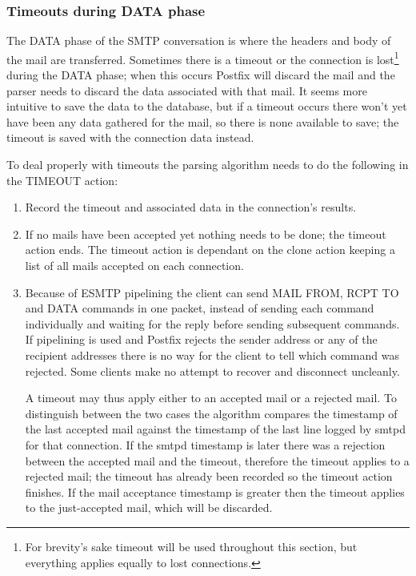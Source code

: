 \documentclass[a4paper,12pt,draft]{article}
\begin{document}
\subsubsection{Timeouts during DATA phase}

\label{timeouts-during-data-phase}

The DATA phase of the SMTP conversation is where the headers and body of the
mail are transferred.  Sometimes there is a timeout or the connection is
lost\footnote{For brevity's sake timeout will be used throughout this
section, but everything applies equally to lost connections.} during the
DATA phase; when this occurs Postfix will discard the mail and the parser
needs to discard the data associated with that mail.  It seems more
intuitive to save the data to the database, but if a timeout occurs there
won't yet have been any data gathered for the mail, so there is none
available to save; the timeout is saved with the connection data instead.

To deal properly with timeouts the parsing algorithm needs to do the
following in the TIMEOUT action:

\begin{enumerate}

    \item Record the timeout and associated data in the connection's
        results.

    \item If no mails have been accepted yet nothing needs to be done; the
        timeout action ends.  The timeout action is dependant on the clone
        action keeping a list of all mails accepted on each connection.

    \item Because of ESMTP pipelining the client can send MAIL FROM, RCPT
        TO and DATA commands in one packet, instead of sending each command
        individually and waiting for the reply before sending subsequent
        commands.  If pipelining is used and Postfix rejects the sender
        address or any of the recipient addresses there is no way for the
        client to tell which command was rejected.  Some clients make no
        attempt to recover and disconnect uncleanly.

        A timeout may thus apply either to an accepted mail or a rejected
        mail.  To distinguish between the two cases the algorithm compares
        the timestamp of the last accepted mail against the timestamp of
        the last line logged by smtpd for that connection.  If the smtpd
        timestamp is later there was a rejection between the accepted mail
        and the timeout, therefore the timeout applies to a rejected mail;
        the timeout has already been recorded so the timeout action
        finishes.  If the mail acceptance timestamp is greater then the
        timeout applies to the just-accepted mail, which will be discarded.

\end{enumerate}
\end{document}
